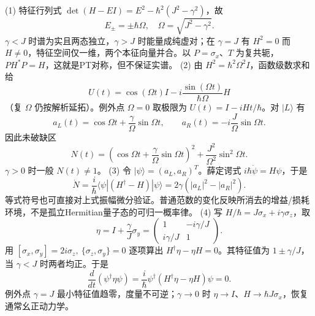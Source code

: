 (1) 特征行列式 \(\det(H-EI)=E^2-\hbar^2(J^2-\gamma^2)\)，故
\[
E_\pm=\pm\hbar\Omega,\quad \Omega=\sqrt{J^2-\gamma^2}.
\]
\(\gamma<J\) 时谱为实且两态独立，\(\gamma>J\) 时能量成纯虚对；在 \(\gamma=J\) 有 \(H^2=0\) 而 \(H\ne0\)，特征空间仅一维，两个本征向量并合。以 \(P=\sigma_x\)、\(T\) 为复共轭，\(P H^*P=H\)，这就是PT对称，但不保证实谱。
(2) 由 \(H^2=\hbar^2\Omega^2I\)，函数级数求和给
\[
U(t)=\cos(\Omega t)I-i\frac{\sin(\Omega t)}{\hbar\Omega}H
\]
（复 \(\Omega\) 仍按解析延拓）。例外点 \(\Omega=0\) 取极限为 \(U(t)=I-iHt/\hbar\)。对 \(|L\rangle\) 有
\[
a_L(t)=\cos\Omega t+\frac{\gamma}{\Omega}\sin\Omega t,\qquad
a_R(t)=-i\frac J{\Omega}\sin\Omega t.
\]
因此未破缺区
\[
N(t)=\left(\cos\Omega t+\frac{\gamma}{\Omega}\sin\Omega t\right)^2+
\frac{J^2}{\Omega^2}\sin^2\Omega t.
\]
\(\gamma>0\) 时一般 \(N(t)\ne1\)。
(3) 令 \(|\psi\rangle=(a_L,a_R)^T\)。薛定谔式 \(i\hbar\dot\psi=H\psi\)，于是
\[
\dot N=\frac i\hbar\langle\psi|(H^\dagger-H)|\psi\rangle
=2\gamma(|a_L|^2-|a_R|^2).
\]
等式符号也可直接对上式振幅微分验证。普通范数的变化反映所消去的增益/损耗环境，不是孤立Hermitian量子态的可归一概率律。
(4) 写 \(H/\hbar=J\sigma_x+i\gamma\sigma_z\)，取
\[
\eta=I+\frac{\gamma}{J}\sigma_y
=\begin{pmatrix}1&-i\gamma/J\\i\gamma/J&1\end{pmatrix}.
\]
用 \([\sigma_x,\sigma_y]=2i\sigma_z,\ \{\sigma_z,\sigma_y\}=0\) 逐项算出 \(H^\dagger\eta-\eta H=0\)。其特征值为 \(1\pm\gamma/J\)，当 \(\gamma<J\) 时两者均正。于是
\[
\frac d{dt}(\psi^\dagger\eta\psi)=\frac i\hbar\psi^\dagger(H^\dagger\eta-\eta H)\psi=0.
\]
例外点 \(\gamma=J\) 最小特征值趋零，度量不可逆；\(\gamma\to0\) 时 \(\eta\to I\)、\(H\to\hbar J\sigma_x\)，恢复通常幺正动力学。
